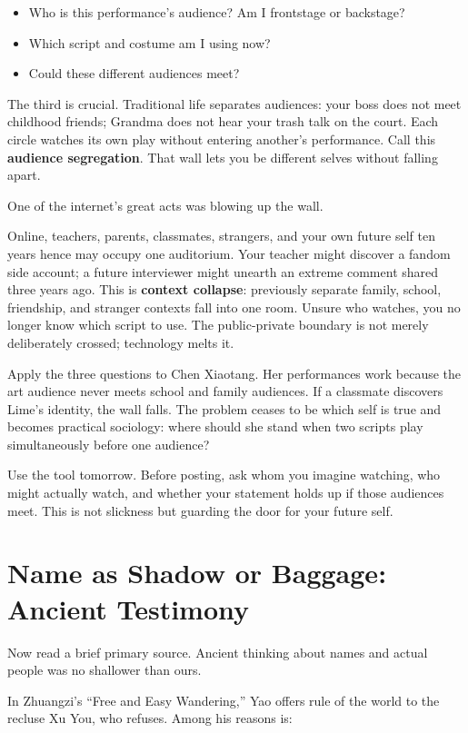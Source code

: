 \begin{itemize}
\item Who is this performance's audience? Am I frontstage or backstage?
\item Which script and costume am I using now?
\item Could these different audiences meet?
\end{itemize}
The third is crucial. Traditional life separates audiences: your boss does not meet childhood friends; Grandma does not hear your trash talk on the court. Each circle watches its own play without entering another's performance. Call this \textbf{audience segregation}. That wall lets you be different selves without falling apart.

One of the internet's great acts was blowing up the wall.

Online, teachers, parents, classmates, strangers, and your own future self ten years hence may occupy one auditorium. Your teacher might discover a fandom side account; a future interviewer might unearth an extreme comment shared three years ago. This is \textbf{context collapse}: previously separate family, school, friendship, and stranger contexts fall into one room. Unsure who watches, you no longer know which script to use. The public-private boundary is not merely deliberately crossed; technology melts it.

Apply the three questions to Chen Xiaotang. Her performances work because the art audience never meets school and family audiences. If a classmate discovers Lime's identity, the wall falls. The problem ceases to be which self is true and becomes practical sociology: where should she stand when two scripts play simultaneously before one audience?

Use the tool tomorrow. Before posting, ask whom you imagine watching, who might actually watch, and whether your statement holds up if those audiences meet. This is not slickness but guarding the door for your future self.

\section[Names: Ancient Testimony]{Name as Shadow or Baggage: Ancient Testimony}
Now read a brief primary source. Ancient thinking about names and actual people was no shallower than ours.

In Zhuangzi's ``Free and Easy Wandering,'' Yao offers rule of the world to the recluse Xu You, who refuses. Among his reasons is:

